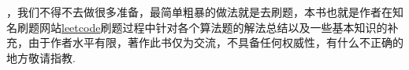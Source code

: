 
\begin{flushleft}
，我们不得不去做很多准备，最简单粗暴的做法就是去刷题，本书也就是作者在知名刷题网站\href{https://leetcode.com/problemset/algorithms/}{leetcode}刷题过程中针对各个算法题的解法总结以及一些基本知识的补充，由于作者水平有限，著作此书仅为交流，不具备任何权威性，有什么不正确的地方敬请指教.
\end{flushleft}
